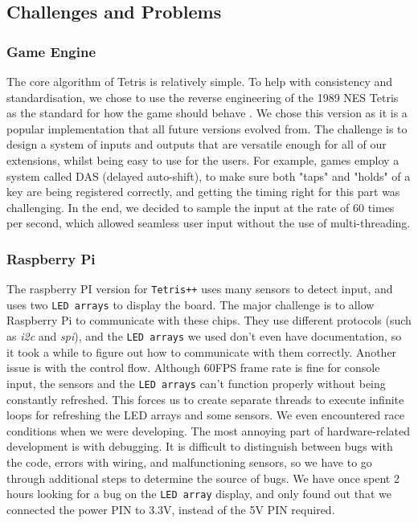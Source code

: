 \documentclass[11pt]{article}
\begin{document}

\subsection{Challenges and Problems}

\subsubsection{Game Engine}
\begin{flushleft}
The core algorithm of Tetris is relatively simple. To help with consistency and standardisation, we chose to use the reverse engineering of the 1989 NES Tetris as the standard for how the game should behave \cite{tetrisreverseengineering}. We chose this version as it is a popular implementation that all future versions evolved from. The challenge is to design a system of inputs and outputs that are versatile enough for all of our extensions, whilst being easy to use for the users. For example, games employ a system called DAS (delayed auto-shift), to make sure both "taps" and "holds" of a key are being registered correctly, and getting the timing right for this part was challenging. In the end, we decided to sample the input at the rate of 60 times per second, which allowed seamless user input without the use of multi-threading. 
\end{flushleft}

\subsubsection{Raspberry Pi}
\begin{flushleft}
The raspberry PI version for \texttt{Tetris++} uses many sensors to detect input, and uses two \texttt{LED arrays} to display the board. The major challenge is to allow Raspberry Pi to communicate with these chips. They use different protocols (such as \textit{i2c} and \textit{spi}), and the \texttt{LED arrays} we used don't even have documentation, so it took a while to figure out how to communicate with them correctly. Another issue is with the control flow. Although 60FPS frame rate is fine for console input, the sensors and the \texttt{LED arrays} can't function properly without being constantly refreshed. This forces us to create separate threads to execute infinite loops for refreshing the LED arrays and some sensors. We even encountered race conditions when we were developing. The most annoying part of hardware-related development is with debugging. It is difficult to distinguish between bugs with the code, errors with wiring, and malfunctioning sensors, so we have to go through additional steps to determine the source of bugs. We have once spent 2 hours looking for a bug on the \texttt{LED array} display, and only found out that we connected the power PIN to 3.3V, instead of the 5V PIN required.
\end{flushleft}
\end{document}
